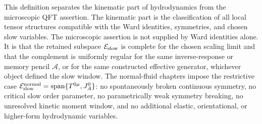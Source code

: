 This definition separates the kinematic part of hydrodynamics from the
microscopic QFT assertion.  The kinematic part is the classification of all
local tensor structures compatible with the Ward identities, symmetries, and
chosen slow variables.  The microscopic assertion is not supplied by Ward
identities alone.  It is that the retained subspace
\(\mathcal E_{\rm slow}\) is complete for the chosen scaling limit and that
the complement is uniformly regular for the same inverse-response or memory
pencil \(\mathcal A\), or for the same constructed effective generator,
whichever object defined the slow window.  The
normal-fluid chapters impose the restrictive case
\(\mathcal E_{\rm slow}^{\rm normal}=\operatorname{span}\{T^{0\mu},J_A^0\}\):
no spontaneously broken continuous symmetry, no critical slow order
parameter, no parametrically weak symmetry breaking, no unresolved kinetic
moment window, and no additional elastic, orientational, or higher-form
hydrodynamic variables.

